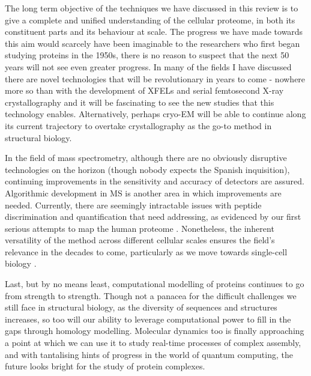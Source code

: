 \documentclass[a4paper,11pt,twoside,openright]{scrbook}
\begin{document}
The long term objective of the techniques we have discussed in this review is to give a complete and unified understanding of the cellular proteome, in both its constituent parts and its behaviour at scale. The progress we have made towards this aim would scarcely have been imaginable to the researchers who first began studying proteins in the 1950s, there is no reason to suspect that the next 50 years will not see even greater progress. In many of the fields I have discussed there are novel technologies that will be revolutionary in years to come - nowhere more so than with the development of XFELs and serial femtosecond X-ray crystallography and it will be fascinating to see the new studies that this technology enables. Alternatively, perhaps cryo-EM will be able to continue along its current trajectory to overtake crystallography as the go-to method in structural biology.

In the field of mass spectrometry, although there are no obviously disruptive technologies on the horizon (though nobody expects the Spanish inquisition), continuing improvements in the sensitivity and accuracy of detectors are assured. Algorithmic development in MS is another area in which improvements are needed. Currently, there are seemingly intractable issues with peptide discrimination and quantification that need addressing, as evidenced by our first serious attempts to map the human proteome \cite{Kim2014,Wilhelm2014,Ezkurdia2014}. Nonetheless, the inherent versatility of the method across different cellular scales ensures the field's relevance in the decades to come, particularly as we move towards single-cell biology \cite{Macaulay2017}.

Last, but by no means least, computational modelling of proteins continues to go from strength to strength. Though not a panacea for the difficult challenges we still face in structural biology, as the diversity of sequences and structures increases, so too will our ability to leverage computational power to fill in the gaps through homology modelling. Molecular dynamics too is finally approaching a point at which we can use it to study real-time processes of complex assembly, and with tantalising hints of progress in the world of quantum computing, the future looks bright for the study of protein complexes.

\end{document}
